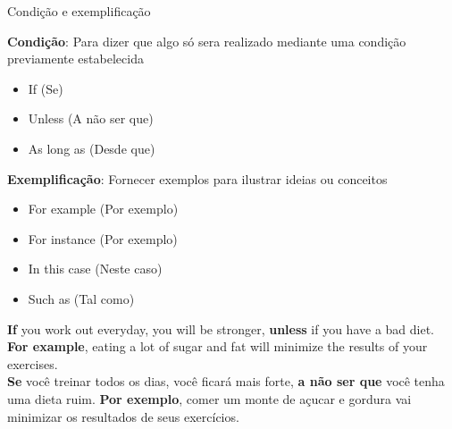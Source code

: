 \documentclass[compress,mathserif,xcolor=table]{beamer}
\begin{document}

\begin{frame}{Condição e exemplificação}

\textbf{Condição}: Para dizer que algo só sera realizado mediante uma condição previamente estabelecida

\vspace{0.15cm}

\begin{minipage}{.49\textwidth}
\begin{itemize}
    \item If (Se)
    \item Unless (A não ser que)
\end{itemize}
\end{minipage}
\begin{minipage}{.49\textwidth}
\begin{itemize}
    \item As long as (Desde que)
\end{itemize}
\end{minipage}

\vspace{0.25cm}

\textbf{Exemplificação}: Fornecer exemplos para ilustrar ideias ou conceitos

\vspace{0.15cm}

\begin{minipage}{.49\textwidth}
\begin{itemize}
    \item For example (Por exemplo)
    \item For instance (Por exemplo)
\end{itemize}
\end{minipage}
\begin{minipage}{.49\textwidth}
\begin{itemize}
    \item In this case (Neste caso)
    \item Such as (Tal como)
\end{itemize}
\end{minipage}

\vspace{0.25cm}

\textbf{If} you work out everyday, you will be stronger, \textbf{unless} if you have a bad diet. \textbf{For example}, eating a lot of sugar and fat will minimize the results of your exercises. \\
\vspace{0.15cm}
\textbf{Se} você treinar todos os dias, você ficará mais forte, \textbf{a não ser que} você tenha uma dieta ruim. \textbf{Por exemplo}, comer um monte de açucar e gordura vai minimizar os resultados de seus exercícios.

\end{frame}
\end{document}
